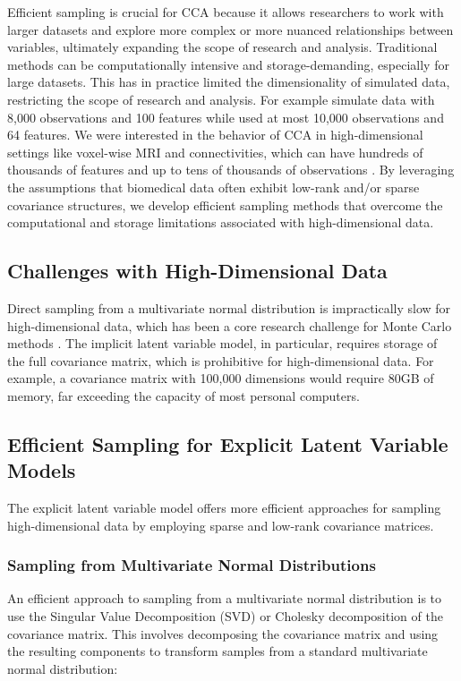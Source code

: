 Efficient sampling is crucial for CCA because it allows researchers to work with larger datasets and explore more complex or more nuanced relationships between variables, ultimately expanding the scope of research and analysis. Traditional methods can be computationally intensive and storage-demanding, especially for large datasets.
This has in practice limited the dimensionality of simulated data, restricting the scope of research and analysis.
For example \citet{matkovic2023contribution} simulate data with 8,000 observations and 100 features while \citet{helmer2020stability} used at most 10,000 observations and 64 features.
We were interested in the behavior of CCA in high-dimensional settings like voxel-wise MRI and connectivities, which can have hundreds of thousands of features \citep{jack2008alzheimer} and up to tens of thousands of observations \citep{sudlow2015uk}.
By leveraging the assumptions that biomedical data often exhibit low-rank and/or sparse covariance structures, we develop efficient sampling methods that overcome the computational and storage limitations associated with high-dimensional data.

\subsection{Challenges with High-Dimensional Data}
Direct sampling from a multivariate normal distribution is impractically slow for high-dimensional data, which has been a core research challenge for Monte Carlo methods \citep{mackay1998introduction}. The implicit latent variable model, in particular, requires storage of the full covariance matrix, which is prohibitive for high-dimensional data. For example, a covariance matrix with 100,000 dimensions would require 80GB of memory, far exceeding the capacity of most personal computers.

\subsection{Efficient Sampling for Explicit Latent Variable Models}
The explicit latent variable model offers more efficient approaches for sampling high-dimensional data by employing sparse and low-rank covariance matrices.

\subsubsection{Sampling from Multivariate Normal Distributions}
An efficient approach to sampling from a multivariate normal distribution is to use the Singular Value Decomposition (SVD) or Cholesky decomposition of the covariance matrix. This involves decomposing the covariance matrix and using the resulting components to transform samples from a standard multivariate normal distribution:

